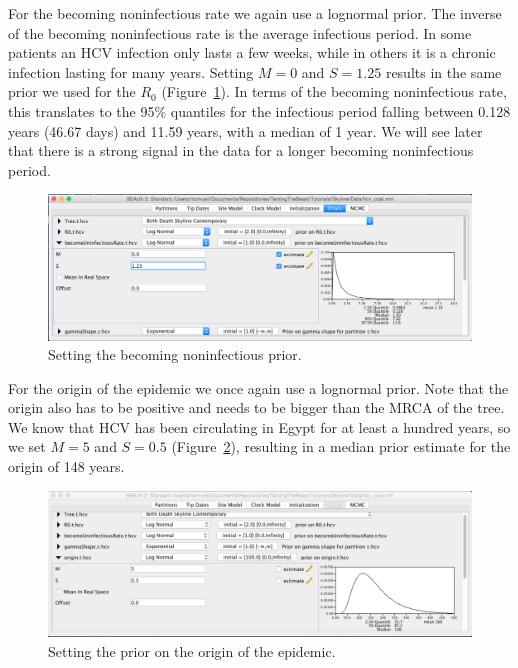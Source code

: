 \documentclass[11pt]{article}
\begin{document}
For the becoming noninfectious rate we again use a lognormal prior. The inverse of the becoming noninfectious rate is the average infectious period. In some patients an HCV infection only lasts a few weeks, while in others it is a chronic infection lasting for many years. Setting $M=0$ and $S=1.25$ results in the same prior we used for the $R_0$ (Figure~\ref{fig:bURprior}).  In terms of the becoming noninfectious rate, this translates to the 95\% quantiles for the infectious period falling between 0.128 years (46.67 days) and 11.59 years, with a median of 1 year. We will see later that there is a strong signal in the data for a longer becoming noninfectious period. 

\begin{figure}[h!]
\centering
\includegraphics[width=\textwidth]{figures/bdsky_prior_uninf.png}
\caption{\small Setting the becoming noninfectious prior.}
\label{fig:bURprior}
\end{figure}

For the origin of the epidemic we once again use a lognormal prior. Note that the origin also has to be positive and needs to be bigger than the MRCA of the tree. We know that HCV has been circulating in Egypt for at least a hundred years, so we set $M=5$ and $S=0.5$ (Figure~\ref{fig:oriprior}), resulting in a median prior estimate for the origin of 148 years.


\begin{figure}[h!]
\centering
\includegraphics[width=\textwidth]{figures/bdsky_prior_ori.png}
\caption{\small Setting the prior on the origin of the epidemic.}
\label{fig:oriprior}
\end{figure}
\end{document}
